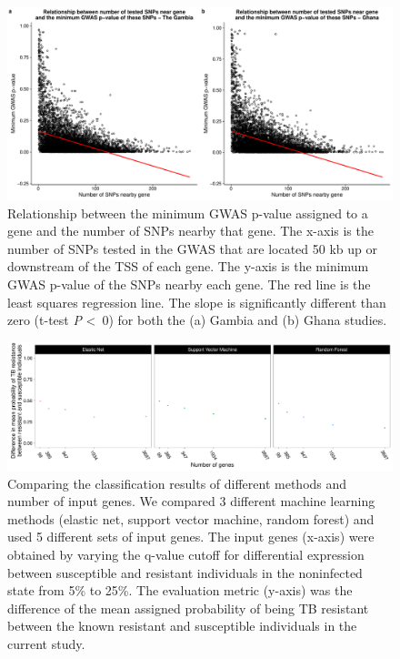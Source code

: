 \documentclass[fleqn,10pt]{wlscirep}
\begin{document}
\begin{figure}[ht]
\centering
\includegraphics[width=\linewidth]{../figure/gwas-n-snps.pdf}
\caption{
Relationship between the minimum GWAS p-value assigned to a gene and
the number of SNPs nearby that gene. The x-axis is the number of SNPs
tested in the GWAS that are located 50 kb up or downstream of the TSS
of each gene. The y-axis is the minimum GWAS p-value of the SNPs
nearby each gene. The red line is the least squares regression line.
The slope is significantly different than zero (t-test \emph{P}
\textless \, 0) for both the (a) Gambia and (b) Ghana studies.
}
\label{fig:gwas-n-snps}
\end{figure}

\begin{figure}[ht]
\centering
\includegraphics[width=\linewidth]{../figure/classifier-compare.pdf}
\caption{
Comparing the classification results of different methods and number
of input genes. We compared 3 different machine learning methods
(elastic net, support vector machine, random forest) and used 5
different sets of input genes. The input genes (x-axis) were obtained
by varying the q-value cutoff for differential expression between
susceptible and resistant individuals in the noninfected state from
5\% to 25\%. The evaluation metric (y-axis) was the difference of the
mean assigned probability of being TB resistant between the known
resistant and susceptible individuals in the current study.
}
\label{fig:class-compare}
\end{figure}
\end{document}
